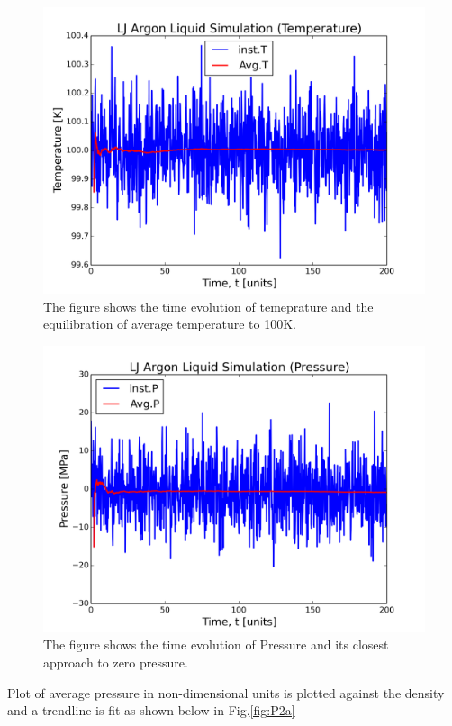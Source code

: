 \documentclass{article}
\begin{document}
\begin{figure}[htb]
\centering
\includegraphics[width=.9\linewidth]{./V-4/LJ-md-Temp.png}
\caption{\label{fig:P2a2}The figure shows the time evolution of temeprature and the equilibration of average temperature to 100K.}
\end{figure}

\begin{figure}[htb]
\centering
\includegraphics[width=.9\linewidth]{./V-4/LJ-md-Pressure.png}
\caption{\label{fig:P2a3}The figure shows the time evolution of Pressure and its closest approach to zero pressure.}
\end{figure}

Plot of average pressure in non-dimensional units is plotted against the density and a trendline is fit as shown below in Fig.\ref{fig:P2a}
\end{document}
